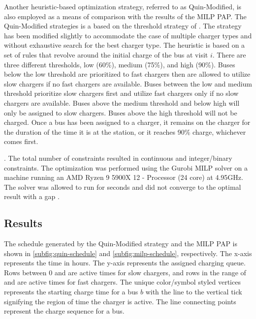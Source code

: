 Another heuristic-based optimization strategy, referred to as Quin-Modified, is also employed as a means of comparison
with the results of the MILP PAP. The Quin-Modified strategies is a based on the threshold strategy of \cite{Qin2016}.
The strategy has been modified slightly to accommodate the case of multiple charger types and without exhaustive search
for the best charger type. The heuristic is based on a set of rules that revolve around the initial charge of the bus at
visit $i$. There are three different thresholds, low (60\%), medium (75\%), and high (90\%). Buses below the low
threshold are prioritized to fast chargers then are allowed to utilize slow chargers if no fast chargers are available.
Buses between the low and medium threshold prioritize slow chargers first and utilize fast chargers only if no slow
chargers are available. Buses above the medium threshold and below high will only be assigned to slow chargers. Buses
above the high threshold will not be charged. Once a bus has been assigned to a charger, it remains on the charger for
the duration of the time it is at the station, or it reaches 90\% charge, whichever comes first.

. The total number of constraints resulted in \contvars continuous and \intvars integer/binary constraints. The
optimization was performed using the Gurobi MILP solver \cite{GurobiOptimization2021} on a machine running an AMD Ryzen
9 5900X 12 - Processor (24 core) at 4.95GHz. The solver was allowed to run for \timeran seconds and did not converge to
the optimal result with a gap \gappercent.

%
\subsection{Results}

The schedule generated by the Quin-Modified strategy and the MILP PAP is shown in \autoref{subfig:quin-schedule} and
\autoref{subfig:milp-schedule}, respectively. The x-axis represents the time in hours. The y-axis represents the
assigned charging queue. Rows between 0 and  are active times for slow chargers, and rows in the range
of  and  are active times for fast chargers. The unique color/symbol styled
vertices represents the starting charge time for a bus $b$ with the line to the vertical tick signifying the region of
time the charger is active. The line connecting points represent the charge sequence for a bus.

